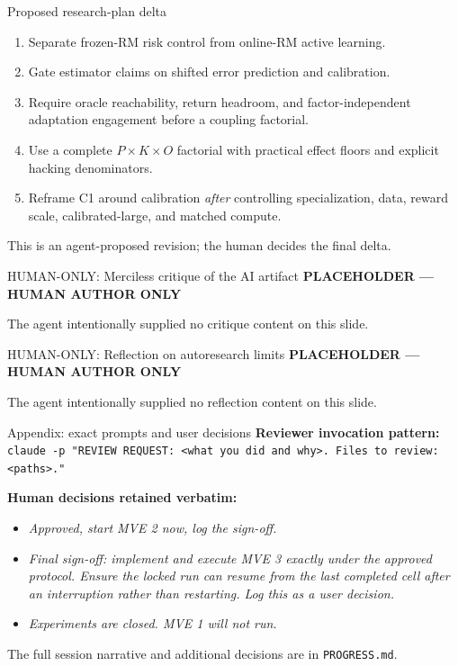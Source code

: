 \documentclass[aspectratio=169,10pt]{beamer}
\begin{document}
\begin{frame}{Proposed research-plan delta}
\begin{enumerate}
  \item Separate frozen-RM risk control from online-RM active learning.
  \item Gate estimator claims on shifted error prediction and calibration.
  \item Require oracle reachability, return headroom, and factor-independent adaptation engagement before a coupling factorial.
  \item Use a complete $P\times K\times O$ factorial with practical effect floors and explicit hacking denominators.
  \item Reframe C1 around calibration \emph{after} controlling specialization, data, reward scale, calibrated-large, and matched compute.
\end{enumerate}
This is an agent-proposed revision; the human decides the final delta.
\end{frame}

\begin{frame}{HUMAN-ONLY: Merciless critique of the AI artifact}
\centering
\Large \textbf{PLACEHOLDER --- HUMAN AUTHOR ONLY}

\vspace{1.5em}
\normalsize The agent intentionally supplied no critique content on this slide.
\end{frame}

\begin{frame}{HUMAN-ONLY: Reflection on autoresearch limits}
\centering
\Large \textbf{PLACEHOLDER --- HUMAN AUTHOR ONLY}

\vspace{1.5em}
\normalsize The agent intentionally supplied no reflection content on this slide.
\end{frame}

\appendix
\begin{frame}{Appendix: exact prompts and user decisions}
\scriptsize
\textbf{Reviewer invocation pattern:}\\
\texttt{claude -p "REVIEW REQUEST: <what you did and why>. Files to review: <paths>."}

\vspace{0.5em}
\textbf{Human decisions retained verbatim:}
\begin{itemize}
  \item \textit{Approved, start MVE 2 now, log the sign-off.}
  \item \textit{Final sign-off: implement and execute MVE 3 exactly under the approved protocol. Ensure the locked run can resume from the last completed cell after an interruption rather than restarting. Log this as a user decision.}
  \item \textit{Experiments are closed. MVE 1 will not run.}
\end{itemize}
The full session narrative and additional decisions are in \texttt{PROGRESS.md}.
\end{frame}
\end{document}
